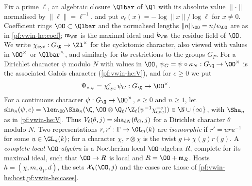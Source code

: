 Fix a prime $\ell$, an algebraic closure $\Qlbar$ of $\Ql$ with its absolute value $\|\cdot\|$ normalised by
$\|\ell\|=\ell^{-1}$, and put $v_\ell(x)=-\log\|x\|/\log\ell$ for $x\ne0$. Coefficient rings $\OO\subset\Qlbar$ and the
normalised lengths $\|n\|_\OO=n/e_\OO$ are as in \cref{pf:vwin-he:coef}; $\mathfrak m_\OO$ is the maximal ideal and
$k_\OO$ the residue field of $\OO$. We write $\modularitycyc:G_\Q\to\Zl^\times$ for the cyclotomic character, also
viewed with values in $\OO^\times$ or $\Qlbar^\times$, and similarly for its restrictions to the groups $G_F$. For a
Dirichlet character $\psi$ modulo $N$ with values in $\OO$, $\psi_G=\psi\circ\kappa_N:G_\Q\to\OO^\times$ is the
associated Galois character (\cref{pf:vwin-he:V}), and for $e\ge0$ we put
\begin{equation}\label{pf:modularity:Psi}
\Psi_{e,\psi}=\modularitycyc^{e}\,\psi_G:G_\Q\to\OO^\times .
\end{equation}
For a continuous character $\psi:G_\Q\to\OO^\times$, $e\ge0$ and $n\ge1$, let
$\modularitySha_n(\psi,e)=\len_\OO\Sha_n(\Q,\OO\otimes\modularityQZ(\psi^{-1}\modularitycyc^{-e}))\in\N\cup\{\infty\}$,
with $\Sha_n$ as in \cref{pf:vwin-he:V}. Thus $V_\ell(\theta,j)=\mathrm{sha}_{\ell N}(\theta_G,j)$ for a Dirichlet
character $\theta$ modulo $N$. Two representations $r,r':\Gamma\to\GL_n(k)$ are \emph{isomorphic} if
$r'=uru^{-1}$ for some $u\in\GL_n(k)$; for a character $\chi$, $r\otimes\chi$ is the twist $g\mapsto\chi(g)r(g)$.
A \emph{complete local $\OO$-algebra} is a Noetherian local $\OO$-algebra $R$, complete for its maximal ideal, such
that $\OO\to R$ is local and $R=\OO+\mathfrak m_R$. Hosts $h=(\chi,m,q_1,d)$, the sets $\mathcal X_h(\OO,j)$ and the
cases are those of \cref{pf:vwin-he:host,pf:vwin-he:cases}.

